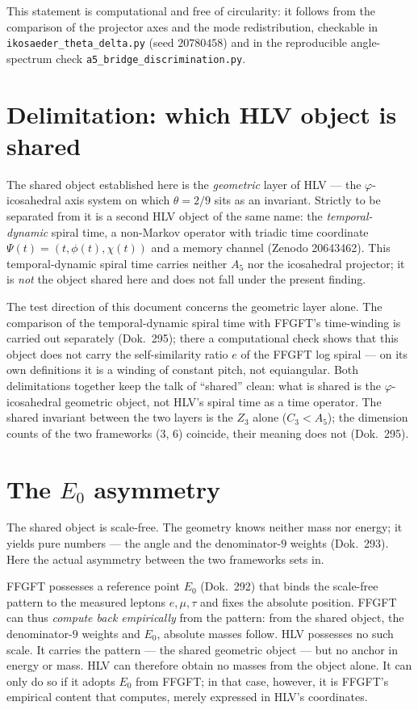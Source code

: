 This statement is computational and free of circularity: it follows from the comparison of the
projector axes and the mode redistribution, checkable in \texttt{ikosaeder\_theta\_delta.py}
(seed $20780458$) and in the reproducible angle-spectrum check
\texttt{a5\_bridge\_discrimination.py}.

\section{Delimitation: which HLV object is shared}
The shared object established here is the \emph{geometric} layer of HLV --- the
$\varphi$-icosahedral axis system on which $\theta=2/9$ sits as an invariant. Strictly to be
separated from it is a second HLV object of the same name: the \emph{temporal-dynamic} spiral
time, a non-Markov operator with triadic time coordinate $\Psi(t)=(t,\phi(t),\chi(t))$ and a
memory channel (Zenodo 20643462). This temporal-dynamic spiral time carries neither $A_5$ nor the
icosahedral projector; it is \emph{not} the object shared here and does not fall under the present
finding.

The test direction of this document concerns the geometric layer alone. The comparison of the
temporal-dynamic spiral time with FFGFT's time-winding is carried out separately (Dok.~295); there
a computational check shows that this object does not carry the self-similarity ratio $e$ of the
FFGFT log spiral --- on its own definitions it is a winding of constant pitch, not equiangular.
Both delimitations together keep the talk of \enquote{shared} clean: what is shared is the
$\varphi$-icosahedral geometric object, not HLV's spiral time as a time operator. The shared
invariant between the two layers is the $Z_3$ alone ($C_3<A_5$); the dimension counts of the two
frameworks ($3$, $6$) coincide, their meaning does not (Dok.~295).

\section{The $E_0$ asymmetry}
The shared object is scale-free. The geometry knows neither mass nor energy; it yields pure
numbers --- the angle and the denominator-$9$ weights (Dok.~293). Here the actual asymmetry
between the two frameworks sets in.

FFGFT possesses a reference point $E_0$ (Dok.~292) that binds the scale-free pattern to the
measured leptons $e,\mu,\tau$ and fixes the absolute position. FFGFT can thus \emph{compute back
empirically} from the pattern: from the shared object, the denominator-$9$ weights and $E_0$,
absolute masses follow. HLV possesses no such scale. It carries the pattern --- the shared
geometric object --- but no anchor in energy or mass. HLV can therefore obtain no masses from the
object alone. It can only do so if it adopts $E_0$ from FFGFT; in that case, however, it is
FFGFT's empirical content that computes, merely expressed in HLV's coordinates.

